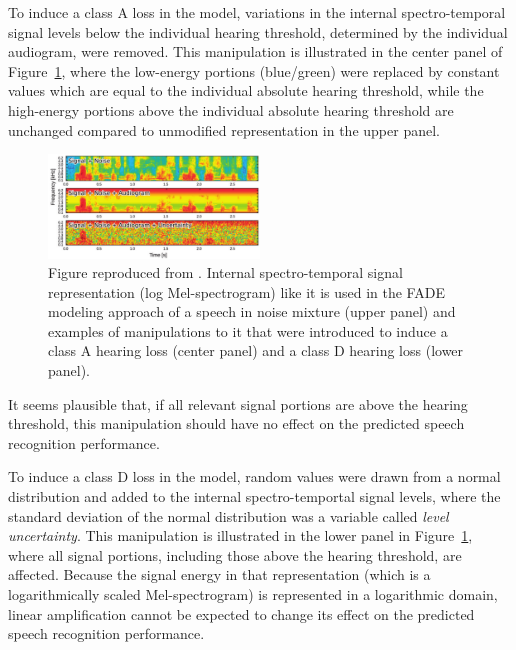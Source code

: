 \documentclass[10pt,a4paper,twocolumn]{article}
\begin{document}
To induce a class A loss in the model, variations in the internal spectro-temporal signal levels below the individual hearing threshold, determined by the individual audiogram, were removed.
%
This manipulation is illustrated in the center panel of Figure~\ref{fig:1}, where the low-energy portions (blue/green) were replaced by constant values which are equal to the individual absolute hearing threshold, while the high-energy portions above the individual absolute hearing threshold are unchanged compared to unmodified representation in the upper panel.
%
\begin{figure}
	\centerline{\includegraphics[width=0.5\textwidth]{images/kollmeier-LOGMS-A-D}} 
	\caption{Figure reproduced from \cite{kollmeier2015}.
		Internal spectro-temporal signal representation (log Mel-spectrogram) like it is used in the FADE modeling approach of a speech in noise mixture (upper panel) and examples of manipulations to it that were introduced to induce a class A hearing loss (center panel) and a class D hearing loss (lower panel).}
	\label{fig:1}
\end{figure}
%
It seems plausible that, if all relevant signal portions are above the hearing threshold, this manipulation should have no effect on the predicted speech recognition performance.

To induce a class D loss in the model, random values were drawn from a normal distribution and added to the internal spectro-temportal signal levels, where the standard deviation of the normal distribution was a variable called \emph{level uncertainty}.
%
This manipulation is illustrated in the lower panel in Figure~\ref{fig:1}, where all signal portions, including those above the hearing threshold, are affected.
%
Because the signal energy in that representation (which is a logarithmically scaled Mel-spectrogram) is represented in a logarithmic domain, linear amplification cannot be expected to change its effect on the predicted speech recognition performance. 
\end{document}
